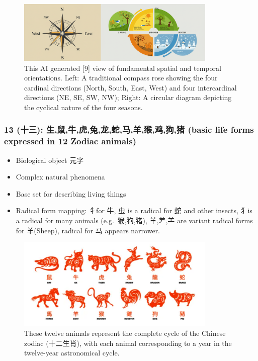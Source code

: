 \documentclass[11pt,letterpaper]{article}
\begin{document}
\begin{figure}
\centering
\includegraphics[width=0.85\textwidth]{./images/8-directions-seasons.png}
\caption{This AI generated {[}9{]} view of fundamental spatial and
temporal orientations. Left: A traditional compass rose showing the four
cardinal directions (North, South, East, West) and four intercardinal
directions (NE, SE, SW, NW); Right: A circular diagram depicting the
cyclical nature of the four seasons.}
\end{figure}

\subsubsection{13 (十三): 生,鼠,牛,虎,兔,龙,蛇,马,羊,猴,鸡,狗,猪 (basic life forms expressed in 12 Zodiac animals)} 
  

  \begin{itemize}
  \tightlist
  \item
    Biological object 元字
  \item
    Complex natural phenomena
  \item
    Base set for describing living things
  \item
    Radical form mapping: 牜for 牛, 虫 is a radical for 蛇 and other
    insects, 犭is a radical for many animals (e.g.~猴,狗,猪), 羊,⺶,⺷
    are variant radical forms for 羊(Sheep), radical for 马 appears
    narrower.
  \end{itemize}

\begin{figure}
\centering
\includegraphics[width=0.85\textwidth]{./images/12-zodiac-animals.png}
\caption{These twelve animals represent the complete cycle of the
Chinese zodiac (十二生肖), with each animal corresponding to a year in
the twelve-year astronomical cycle.}
\end{figure}
\end{document}
